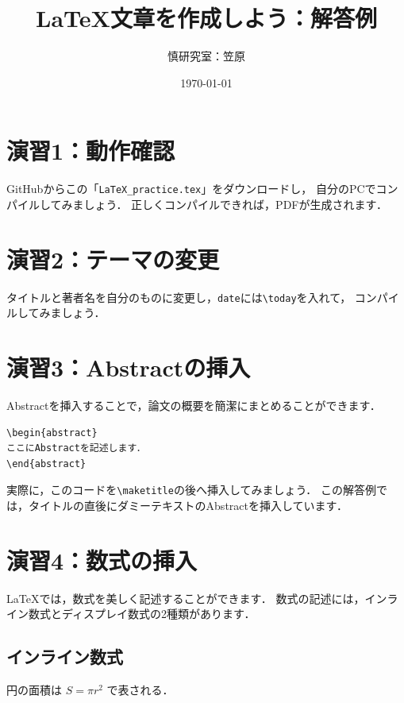 \documentclass[a4paper,twocolumn]{jsarticle}
\title{LaTeX文章を作成しよう：解答例}
\author{慎研究室：笠原}
\date{\today}
\begin{document}
\maketitle

\begin{abstract}
\lipsum[1]
\end{abstract}

\section*{演習1：動作確認}
GitHubからこの「\texttt{LaTeX\_practice.tex}」をダウンロードし，
自分のPCでコンパイルしてみましょう．
正しくコンパイルできれば，PDFが生成されます．

\section*{演習2：テーマの変更}
タイトルと著者名を自分のものに変更し，\texttt{date}には\verb|\today|を入れて，
コンパイルしてみましょう．

\section*{演習3：Abstractの挿入}
Abstractを挿入することで，論文の概要を簡潔にまとめることができます．

\begin{verbatim}
\begin{abstract}
ここにAbstractを記述します．
\end{abstract}
\end{verbatim}

実際に，このコードを\verb|\maketitle|の後へ挿入してみましょう．
この解答例では，タイトルの直後にダミーテキストのAbstractを挿入しています．

\section*{演習4：数式の挿入}
LaTeXでは，数式を美しく記述することができます．
数式の記述には，インライン数式とディスプレイ数式の2種類があります．

\subsection*{インライン数式}
円の面積は $S=\pi r^2$ で表される．
\end{document}
